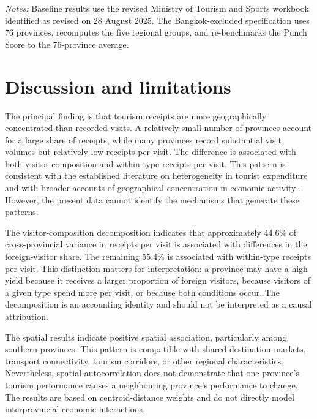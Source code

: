 \documentclass[11pt,a4paper]{article}
\begin{document}
\begin{table}[t]\centering\small
\caption{Robustness of the main results, 2024}\label{tab:robust}
\resizebox{\textwidth}{!}{}\par\smallskip
\parbox{\textwidth}{\scriptsize\emph{Notes:} Baseline results use the revised Ministry of Tourism and Sports workbook identified as revised on 28 August 2025. The Bangkok-excluded specification uses 76 provinces, recomputes the five regional groups, and re-benchmarks the Punch Score to the 76-province average.}
\end{table}

\section{Discussion and limitations}
The principal finding is that tourism receipts are more geographically concentrated than recorded visits. A relatively small number of provinces account for a large share of receipts, while many provinces record substantial visit volumes but relatively low receipts per visit. The difference is associated with both visitor composition and within-type receipts per visit. This pattern is consistent with the established literature on heterogeneity in tourist expenditure \citep{wang2010,brida2013} and with broader accounts of geographical concentration in economic activity \citep{krugman1991}. However, the present data cannot identify the mechanisms that generate these patterns.

The visitor-composition decomposition indicates that approximately 44.6\% of cross-provincial variance in receipts per visit is associated with differences in the foreign-visitor share. The remaining 55.4\% is associated with within-type receipts per visit. This distinction matters for interpretation: a province may have a high yield because it receives a larger proportion of foreign visitors, because visitors of a given type spend more per visit, or because both conditions occur. The decomposition is an accounting identity and should not be interpreted as a causal attribution.

The spatial results indicate positive spatial association, particularly among southern provinces. This pattern is compatible with shared destination markets, transport connectivity, tourism corridors, or other regional characteristics. Nevertheless, spatial autocorrelation does not demonstrate that one province's tourism performance causes a neighbouring province's performance to change. The results are based on centroid-distance weights and do not directly model interprovincial economic interactions.
\end{document}
